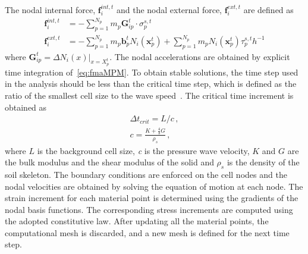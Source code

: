 %
The nodal internal force, $\mathbf{f}_{\mathit{i}}^{int,\mathit{t}}$ and the 
nodal external force, $\mathbf{f}_{\mathit{i}}^{ext,\mathit{t}}$ are defined as
%
\begin{align}
\nonumber
 \mathbf{f}_{\mathit{i}}^{int,\mathit{t}} & = - 
\sum\limits_{\mathit{p}=1}^{\mathit{N}_{p}}\mathit{m}_{p} \mathbf{G}_{ip}^{t} 
\cdot \sigma_{p}^{\mathit{s,t}} \\ 
\mathbf{f}_{\mathit{i}}^{ext,\mathit{t}} & = - 
\sum\limits_{\mathit{p}=1}^{\mathit{N}_{p}}\mathit{m}_{p}  
\mathbf{b}_{p}^{\mathit{t}}\mathit{N}_{\mathit{i}}(\mathbf{x}_{p}^{\mathit{t}}) 
+ \sum\limits_{\mathit{p}=1}^{\mathit{N}_{p}}\mathit{m}_{p} 
\mathit{N}_{\mathit{i}}(\mathbf{x}_{p}^{\mathit{t}}) 
\tau_{p}^{\mathit{s,t}}\mathit{h}^{-1}
\end{align}
where $\mathbf{G}_{\mathit{ip}}^{\mathit{t}} = \Delta \mathit{N}_{\mathit{i}} 
(\mathbf{\mathit{x}})|_{\mathbf{\mathit{x}}=\mathbf{\mathit{X}}_{p}^{\mathit{t}}}$.
The nodal accelerations are obtained by explicit time integration 
of~\cref{eq:fmaMPM}. To obtain stable solutions, the time step used in the 
analysis should be less than the critical time step, which is defined as the 
ratio of the smallest cell size to the wave speed~\citep{Chen2002}. The 
critical time increment is obtained as
%
\begin{align}
\Delta t_{crit} = L / c \,, \\
c = \frac{K+\frac{4}{3}G}{\rho_s} \,,
\end{align}
where $L$ is the background cell size, \textit{c} is the pressure wave 
velocity, $K$ and $G$ are the bulk modulus and the shear modulus of the solid 
and $\rho_s$ is the density of the soil skeleton. The boundary conditions are 
enforced on the cell nodes and the nodal velocities are obtained by solving the 
equation of motion at each node. The strain increment for each material point 
is determined using the gradients of the nodal basis functions. The 
corresponding stress increments are computed using the adopted constitutive 
law. After updating all the material points, the computational mesh is 
discarded, and a new mesh is defined for the next time step. 


